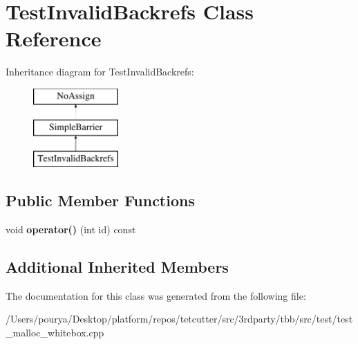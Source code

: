 \hypertarget{classTestInvalidBackrefs}{}\section{Test\+Invalid\+Backrefs Class Reference}
\label{classTestInvalidBackrefs}
Inheritance diagram for Test\+Invalid\+Backrefs\+:\begin{figure}[H]
\begin{center}
\leavevmode
\includegraphics[height=3.000000cm]{classTestInvalidBackrefs}
\end{center}
\end{figure}
\subsection*{Public Member Functions}
\begin{DoxyCompactItemize}
\item 
\hypertarget{classTestInvalidBackrefs_acc98ea6e1ea3131f6bbb5449658c4680}{}void {\bfseries operator()} (int id) const \label{classTestInvalidBackrefs_acc98ea6e1ea3131f6bbb5449658c4680}

\end{DoxyCompactItemize}
\subsection*{Additional Inherited Members}


The documentation for this class was generated from the following file\+:\begin{DoxyCompactItemize}
\item 
/\+Users/pourya/\+Desktop/platform/repos/tetcutter/src/3rdparty/tbb/src/test/test\+\_\+malloc\+\_\+whitebox.\+cpp\end{DoxyCompactItemize}
